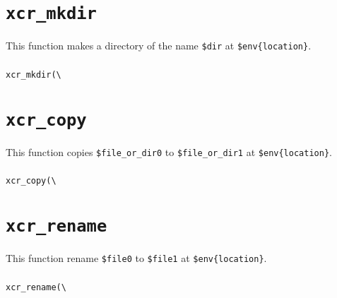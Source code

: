 \documentclass[a4paper,10pt]{report}
\def\|{\verb|} %|
\begin{document}
\section{\texttt{xcr\_mkdir}}

This function makes a directory of the name \texttt{\$dir} at
\texttt{\$env\{location\}}.

\subsubsection{\format}

\begin{boxnote}
\begin{alltt}
xcr_mkdir(\|\|%\textit{env}, $dir);
\end{alltt}
\end{boxnote}
\vspace{\baselineskip}

\section{\texttt{xcr\_copy}}

This function copies \texttt{\$file\_or\_dir0} to
\texttt{\$file\_or\_dir1} at \texttt{\$env\{location\}}.

\subsubsection{\format}

\begin{boxnote}
\begin{alltt}
xcr_copy(\|\|%\textit{env}, $file_or_dir0, $file_or_dir1);
\end{alltt}
\end{boxnote}
\vspace{\baselineskip}

\section{\texttt{xcr\_rename}}

This function rename \texttt{\$file0} to \texttt{\$file1} at
\texttt{\$env\{location\}}.

\subsubsection{\format}

\begin{boxnote}
\begin{alltt}
xcr_rename(\|\|%\textit{env}, $file0, $file1);
\end{alltt}
\end{boxnote}
\vspace{\baselineskip}
\end{document}
